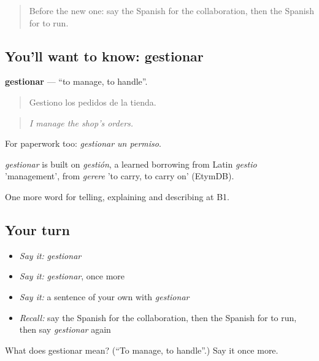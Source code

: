 \label{lesson:ES-C594-gestionar}



\begin{quote}
Before the new one: say the Spanish for the collaboration, then the Spanish for to run.
\end{quote}

\subsection*{You'll want to know: gestionar}
\textbf{gestionar} — \textquotedblleft{}to manage, to handle\textquotedblright{}.

\begin{quote}
Gestiono los pedidos de la tienda.
\end{quote}

\begin{quote}
\emph{I manage the shop's orders.}
\end{quote}

For paperwork too: \emph{gestionar un permiso}.

\begin{cousinweb}
\emph{gestionar} is built on \emph{gestión}, a learned borrowing from Latin \emph{gestio} 'management', from \emph{gerere} 'to carry, to carry on' (EtymDB).
\end{cousinweb}

\begin{grammarlens}[title={What you've built}]
One more word for telling, explaining and describing at B1.
\end{grammarlens}

\subsection*{Your turn}
\begin{itemize}
\raggedright
  \item \emph{Say it:} \emph{gestionar}
  \item \emph{Say it:} \emph{gestionar}, once more
  \item \emph{Say it:} a sentence of your own with \emph{gestionar}
  \item \emph{Recall:} say the Spanish for the collaboration, then the Spanish for to run, then say \emph{gestionar} again
\end{itemize}

\begin{tcolorbox}[breakable,colback=teal!4,colframe=teal!35!black,title={Before you move on}]
What does gestionar mean? (\textquotedblleft{}To manage, to handle\textquotedblright{}.) Say it once more.
\end{tcolorbox}
